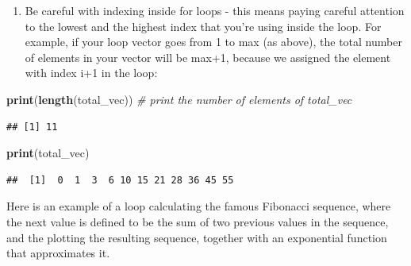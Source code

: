 \documentclass[
]{book}
\newenvironment{Shaded}{\begin{snugshade}}{\end{snugshade}}
\newcommand{\CommentTok}[1]{\textcolor[rgb]{0.56,0.35,0.01}{\textit{#1}}}
\newcommand{\KeywordTok}[1]{\textcolor[rgb]{0.13,0.29,0.53}{\textbf{#1}}}
\newcommand{\NormalTok}[1]{#1}
\providecommand{\tightlist}{%
  \setlength{\itemsep}{0pt}\setlength{\parskip}{0pt}}
\theoremstyle{definition}
\theoremstyle{definition}
\theoremstyle{definition}
\theoremstyle{remark}
\begin{document}
\begin{enumerate}
\def\labelenumi{\arabic{enumi}.}
\setcounter{enumi}{2}
\tightlist
\item
  Be careful with indexing inside for loops - this means paying careful attention to the lowest and the highest index that you're using inside the loop. For example, if your loop vector goes from 1 to max (as above), the total number of elements in your vector will be max+1, because we assigned the element with index i+1 in the loop:
\end{enumerate}

\begin{Shaded}
\begin{Highlighting}[]
\KeywordTok{print}\NormalTok{(}\KeywordTok{length}\NormalTok{(total\_vec)) }\CommentTok{\# print the number of elements of total\_vec}
\end{Highlighting}
\end{Shaded}

\begin{verbatim}
## [1] 11
\end{verbatim}

\begin{Shaded}
\begin{Highlighting}[]
\KeywordTok{print}\NormalTok{(total\_vec)}
\end{Highlighting}
\end{Shaded}

\begin{verbatim}
##  [1]  0  1  3  6 10 15 21 28 36 45 55
\end{verbatim}

Here is an example of a loop calculating the famous Fibonacci sequence, where the next value is defined to be the sum of two previous values in the sequence, and the plotting the resulting sequence, together with an exponential function that approximates it.
\end{document}
